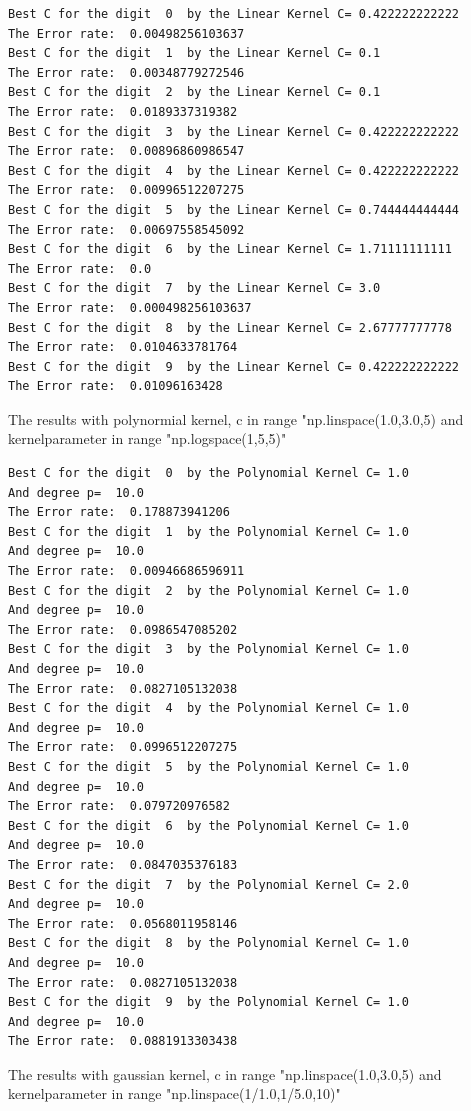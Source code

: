 \documentclass[a4paper,11pt]{article}
\begin{document}
\begin{verbatim}
Best C for the digit  0  by the Linear Kernel C= 0.422222222222
The Error rate:  0.00498256103637
Best C for the digit  1  by the Linear Kernel C= 0.1
The Error rate:  0.00348779272546
Best C for the digit  2  by the Linear Kernel C= 0.1
The Error rate:  0.0189337319382
Best C for the digit  3  by the Linear Kernel C= 0.422222222222
The Error rate:  0.00896860986547
Best C for the digit  4  by the Linear Kernel C= 0.422222222222
The Error rate:  0.00996512207275
Best C for the digit  5  by the Linear Kernel C= 0.744444444444
The Error rate:  0.00697558545092
Best C for the digit  6  by the Linear Kernel C= 1.71111111111
The Error rate:  0.0
Best C for the digit  7  by the Linear Kernel C= 3.0
The Error rate:  0.000498256103637
Best C for the digit  8  by the Linear Kernel C= 2.67777777778
The Error rate:  0.0104633781764
Best C for the digit  9  by the Linear Kernel C= 0.422222222222
The Error rate:  0.01096163428
\end{verbatim}


The results with polynormial kernel, c in range "np.linspace(1.0,3.0,5) and kernelparameter in range "np.logspace(1,5,5)"

\begin{verbatim}
Best C for the digit  0  by the Polynomial Kernel C= 1.0
And degree p=  10.0
The Error rate:  0.178873941206
Best C for the digit  1  by the Polynomial Kernel C= 1.0
And degree p=  10.0
The Error rate:  0.00946686596911
Best C for the digit  2  by the Polynomial Kernel C= 1.0
And degree p=  10.0
The Error rate:  0.0986547085202
Best C for the digit  3  by the Polynomial Kernel C= 1.0
And degree p=  10.0
The Error rate:  0.0827105132038
Best C for the digit  4  by the Polynomial Kernel C= 1.0
And degree p=  10.0
The Error rate:  0.0996512207275
Best C for the digit  5  by the Polynomial Kernel C= 1.0
And degree p=  10.0
The Error rate:  0.079720976582
Best C for the digit  6  by the Polynomial Kernel C= 1.0
And degree p=  10.0
The Error rate:  0.0847035376183
Best C for the digit  7  by the Polynomial Kernel C= 2.0
And degree p=  10.0
The Error rate:  0.0568011958146
Best C for the digit  8  by the Polynomial Kernel C= 1.0
And degree p=  10.0
The Error rate:  0.0827105132038
Best C for the digit  9  by the Polynomial Kernel C= 1.0
And degree p=  10.0
The Error rate:  0.0881913303438
\end{verbatim}

The results with gaussian kernel, c in range "np.linspace(1.0,3.0,5) and kernelparameter in range "np.linspace(1/1.0,1/5.0,10)"
\end{document}

